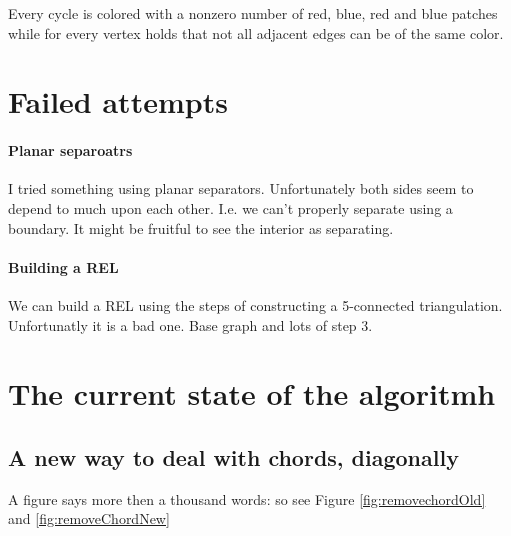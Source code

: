   Every cycle is colored with a nonzero number of red, blue, red and blue patches while for every vertex holds that not all adjacent edges can be of the same color.




\section{Failed attempts}
\paragraph{Planar separoatrs}
I tried something using planar separators. Unfortunately both sides seem to depend to much upon each other. I.e. we can't properly separate using a boundary. It might be fruitful to see the interior as separating.


\paragraph{Building a REL}
We can build a REL using the steps of constructing a 5-connected triangulation. Unfortunatly it is a bad one.
Base graph and lots of step 3.

\section{The current state of the algoritmh}



\subsection{A new way to deal with chords, diagonally}
A figure says more then a thousand words: so see Figure \ref{fig:removechordOld} and \ref{fig:removeChordNew}

